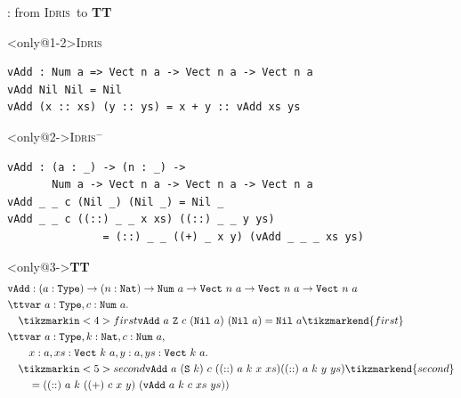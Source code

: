 \documentclass{beamer}
\newcommand\Idris{\textsc{Idris}}
\begin{document}
	\begin{frame}[fragile]{\typetheory: from \Idris\ to \textbf{TT}}
		\begin{block}<only@1-2>{\Idris}
			\begin{lstlisting}[basicstyle=\ttfamily\scriptsize]
vAdd : Num a => Vect n a -> Vect n a -> Vect n a
vAdd Nil Nil = Nil
vAdd (x :: xs) (y :: ys) = x + y :: vAdd xs ys
			\end{lstlisting}
		\end{block}
		\vfill
		
		\begin{block}<only@2->{\Idris$^-$}
		\begin{lstlisting}[basicstyle=\ttfamily\scriptsize]
vAdd : (a : _) -> (n : _) ->
	   Num a -> Vect n a -> Vect n a -> Vect n a
vAdd _ _ c (Nil _) (Nil _) = Nil _
vAdd _ _ c ((::) _ _ x xs) ((::) _ _ y ys)
               = (::) _ _ ((+) _ x y) (vAdd _ _ _ xs ys)
			\end{lstlisting}
		\end{block}
		
		\vfill
		
		\newcommand\vAdd{\texttt{vAdd}}
		\newcommand\Type{\texttt{Type}}
		\newcommand\Nat{\texttt{Nat}}
		\newcommand\Num{\texttt{Num}}
		\newcommand\Vect{\texttt{Vect}}
		\newcommand\Nil{\texttt{Nil}}
		
		\begin{block}<only@3->{\textbf{TT}}
			\footnotesize{
				\begin{align*}
					& \vAdd : (a : \Type) \to (n : \Nat) \to \Num\ a \to \Vect\ n\ a \to \Vect\ n\ a \to \Vect\ n\ a \\
					& \ttvar\ a : \Type, c : \Num\ a. \\
					& \quad \tikzmarkin<4>{first}\vAdd\ a\ \texttt{Z}\ c\ (\Nil\ a)\ (\Nil\ a) = \Nil\ a \tikzmarkend{first} \\
					& \ttvar\ a : \Type, k : \Nat, c : \Num\ a, \\
					& \quad \quad x : a, xs : \Vect\ k\ a, y : a, ys : \Vect\ k\ a. \\
					& \quad \tikzmarkin<5>{second}\vAdd\ a\ (\texttt{S}\ k)\ c\ ((::)\ a\ k\ x\ xs) ((::)\ a\ k\ y\ ys)\tikzmarkend{second} \\
					& \quad \quad = ((::)\ a\ k\ ((+)\ c\ x\ y)\ (\vAdd\ a\ k\ c\ xs\ ys)) \\
				\end{align*}
			}
		\end{block}
	\end{frame}
	
\end{document}
